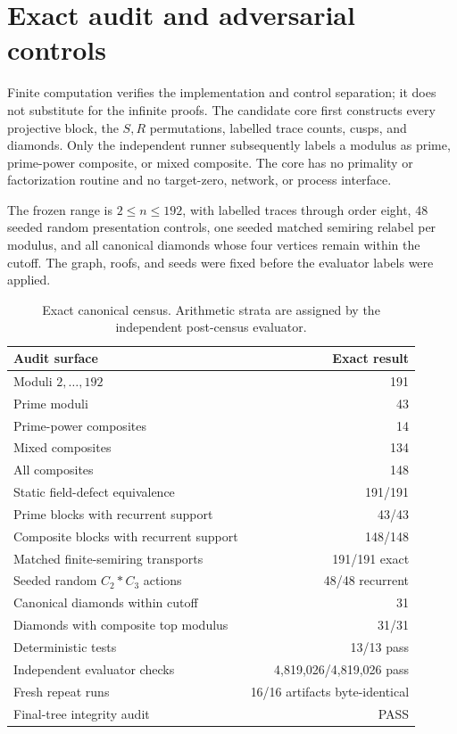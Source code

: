 \section{Exact audit and adversarial controls}
\label{sec:exact-audit}

Finite computation verifies the implementation and control separation; it
does not substitute for the infinite proofs.  The candidate core first
constructs every projective block, the $S,R$ permutations, labelled trace
counts, cusps, and diamonds.  Only the independent runner subsequently labels
a modulus as prime, prime-power composite, or mixed composite.  The core has
no primality or factorization routine and no target-zero, network, or process
interface.

The frozen range is $2\le n\le192$, with labelled traces through order eight,
48 seeded random presentation controls, one seeded matched semiring relabel
per modulus, and all canonical diamonds whose four vertices remain within the
cutoff.  The graph, roofs, and seeds were fixed before the evaluator labels
were applied.

\begin{table}[t]
\centering
\caption{Exact canonical census.  Arithmetic strata are assigned by the
independent post-census evaluator.}
\label{tab:exact-census}
\small
\begin{tabularx}{\textwidth}{Y r}
\toprule
Audit surface & Exact result \\
\midrule
Moduli $2,\ldots,192$ & 191 \\
Prime moduli & 43 \\
Prime-power composites & 14 \\
Mixed composites & 134 \\
All composites & 148 \\
Static field-defect equivalence & 191/191 \\
Prime blocks with recurrent support & 43/43 \\
Composite blocks with recurrent support & 148/148 \\
Matched finite-semiring transports & 191/191 exact \\
Seeded random $C_2*C_3$ actions & 48/48 recurrent \\
Canonical diamonds within cutoff & 31 \\
Diamonds with composite top modulus & 31/31 \\
Deterministic tests & 13/13 pass \\
Independent evaluator checks & 4,819,026/4,819,026 pass \\
Fresh repeat runs & 16/16 artifacts byte-identical \\
Final-tree integrity audit & PASS \\
\bottomrule
\end{tabularx}
\end{table}

